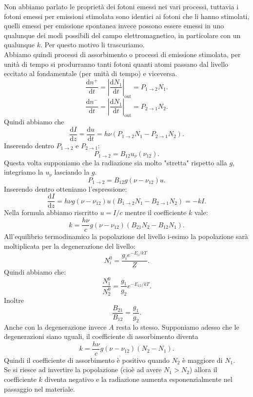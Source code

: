 Non abbiamo parlato le proprietà dei fotoni emessi nei vari processi, tuttavia i fotoni emessi per emissioni stimolata sono identici ai fotoni che li hanno stimolati, quelli emessi per emissione spontanea invece possono essere emessi in uno qualunque dei modi possibili del campo elettromagnetico, in particolare con un qualunque $k$. Per questo motivo li trascuriamo.\\
Abbiamo quindi processi di assorbimento o processi di emissione stimolata, per unità di tempo si produrranno tanti fotoni quanti atomi passano dal livello eccitato al fondamentale (per unità di tempo) e viceversa.
\[
\frac{\text{d} n^+}{\text{d} t} = \left|\frac{\text{d} N_1}{\text{d} t} \right|_\text{out} 
= P_{1\to 2}N_1
.\] 
\[
\frac{\text{d} n^-}{\text{d} t} =\left|\frac{\text{d} N_1}{\text{d} t} \right|_\text{out} = P_{2\to 1}N_2
.\] 
Quindi abbiamo che 
\[
\frac{\text{d} I}{\text{d} z} = \frac{\text{d} u}{\text{d} t} =
h\nu \left(P_{1\to 2}N_1 - P_{2\to 1}N_2\right)
.\] 
Inserendo dentro $P_{1\to 2}$  e $P_{2\to 1}$:
\[
    P_{1 \to 2} = B_{12}u_\nu (\nu_{12}) 
.\] 
Questa volta supponiamo che la radiazione sia molto "stretta" rispetto alla $g$, integriamo la $u_\nu$  lasciando la $g$.  \\
\[
    P_{1 \to 2} = B_{12}g(\nu-\nu_{12})u
.\] 
Inserendo dentro otteniamo l'espressione:
\[
    \frac{\text{d} I}{\text{d} z} = h\nu g(\nu-\nu_{12}) u\left(B_{1\to 2}N_1
    -B_{2\to 1}N_2\right)= -kI
.\] 
Nella formula abbiamo riscritto $u = I /c$  mentre il coefficiente $k$  vale:
\[
    k=\frac{h\nu}{c}g(\nu-\nu_{12})\left(B_{21}N_2 - B_{12}N_1\right) 
.\] 
All'equilibrio termodinamico la popolazione del livello i-esimo la popolazione sarà moltiplicata per la degenerazione del livello:
\[
N_i^0 = \frac{g_i e^{- E_i /kT}}{Z}
.\] 
Quindi abbiamo che:
\[
\frac{N_1^0}{N_2^0} = \frac{g_1}{g_2}e^{-E_{12} /kT}
.\] 
Inoltre
\[
\frac{B_{21}}{B_{12}} = \frac{g_1}{g_2}
.\] 
Anche con la degenerazione invece $A$ resta lo stesso. Supponiamo adesso che le degenerazioni siano uguali, il coefficiente di assorbimento diventa
\[
    k=\frac{h\nu}{c}g(\nu-\nu_{12}) (N_2-N_1) 
.\] 
Quindi il coefficiente di assorbimento è positivo quando $N_2$ è maggiore di $N_1$. \\
Se si riesce ad invertire la popolazione (cioè ad avere $N_1>N_2$) allora il coefficiente $k$ diventa negativo e la radiazione aumenta esponenzialmente nel passaggio nel materiale. 
